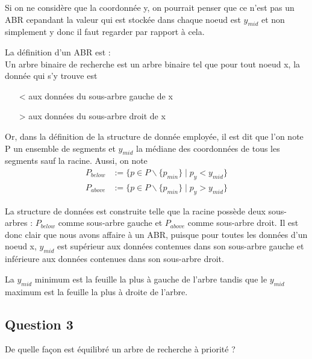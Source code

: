 \documentclass{article}
\newcommand{\gray}{\color{gray}}
\begin{document}
\bigskip

Si on ne considère que la coordonnée y, on pourrait penser que ce n'est pas un ABR cepandant la valeur qui est stockée dans chaque noeud
est $y_{mid}$ et non simplement y donc il faut regarder par rapport à cela.

\medskip

La définition d'un ABR est : \\
Un arbre binaire de recherche est un arbre binaire tel que pour tout noeud x, la donnée qui s'y trouve est
\begin{itemize}
    \item[<] aux données du sous-arbre gauche de x
    \item[>] aux données du sous-arbre droit de x 
\end{itemize}
Or, dans la définition de la structure de donnée employée, il est dit que l'on note P un ensemble de segments et $y_{mid}$ la médiane des coordonnées de tous
les segments sauf la racine. Aussi, on note
\begin{align}
    P_{below} &:= \{p \in P\backslash \{ p_{min} \} \mid p_y < y_{mid}\} \nonumber\\
    P_{above} &:= \{p \in P\backslash \{ p_{min} \} \mid p_y > y_{mid}\} \nonumber
\end{align}

La structure de données est construite telle que la racine possède deux sous-arbres : $P_{below}$ comme sous-arbre gauche
et $P_{above}$ comme sous-arbre droit. Il est donc clair que nous avons affaire à un ABR, puisque pour toutes les données d'un noeud x, 
$y_{mid}$ est supérieur aux données contenues dans son sous-arbre gauche et inférieure aux données contenues dans son sous-arbre droit.

\medskip

La $y_{mid}$ minimum est la feuille la plus à gauche de l'arbre tandis que le $y_{mid}$ maximum est la feuille la plus à droite de l'arbre.



\subsection{Question 3} De quelle façon est équilibré un arbre de recherche à priorité ?

\bigskip

\gray
\end{document}
